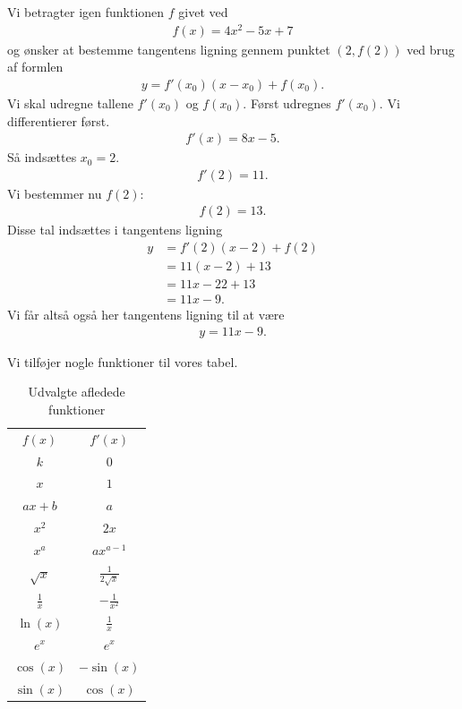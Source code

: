 \begin{exa}
	Vi betragter igen funktionen $f$ givet ved
	\begin{align*}
		f(x) = 4x^2-5x+7
	\end{align*}
	og ønsker at bestemme tangentens ligning gennem punktet $(2,f(2))$ ved brug af formlen
	\begin{align*}
		y = f'(x_0)(x-x_0) + f(x_0).
	\end{align*}
	Vi skal udregne tallene $f'(x_0)$ og $f(x_0)$. Først udregnes $f'(x_0)$.
	Vi differentierer først.
	\begin{align*}
		f'(x) = 8x - 5.
	\end{align*}
	Så indsættes $x_0 = 2.$
	\begin{align*}
		f'(2) = 11.	
	\end{align*}	 
	Vi bestemmer nu $f(2)$:
	\begin{align*}
		f(2) = 13.
	\end{align*}
	Disse tal indsættes i tangentens ligning
	\begin{align*}
		y &= f'(2)(x-2) + f(2)\\
		&= 11(x-2)+13\\
		&= 11x-22+13\\
		&= 11x-9.
	\end{align*}
	Vi får altså også her tangentens ligning til at være
	\begin{align*}
		y = 11x-9.
	\end{align*}
\end{exa}

Vi tilføjer nogle funktioner til vores tabel.
\begin{table}[H]
	\centering
	\begin{tabular}{cc}
		$f(x)$ & $f'(x)$ \\
		$k$ & $0$ \\
		$x$ & $1$ \\
		$ax + b$  & $a$ \\
		$x^2$ & $2x$ \\
		$x^a$ & $ax^{a-1} $ \\
		$\sqrt{x}$ & $\frac{1}{2\sqrt{x}}$ \\
		$\frac{1}{x}$ & $-\frac{1}{x^2}$ \\
		$\ln(x)$ & $\frac{1}{x}$ \\
	 	$e^x$ & $e^x$ \\
	 	$\cos(x)$ & $-\sin(x)$ \\
	 	$\sin(x)$ & $\cos(x)$ \\
	\end{tabular}
	\caption{Udvalgte afledede funktioner}
	\label{tab:afledt}
\end{table}

